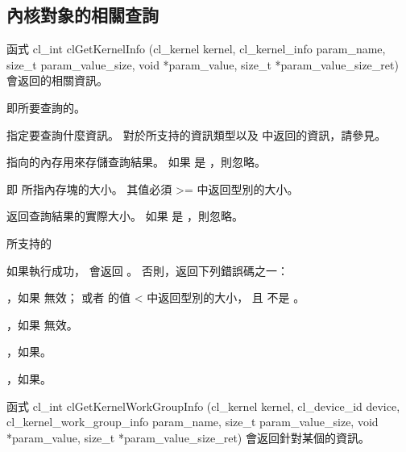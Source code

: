 \subsection{內核對象的相關查詢}

函式
\startCLFUNC
cl_int clGetKernelInfo (cl_kernel kernel,
			cl_kernel_info param_name,
			size_t param_value_size,
			void *param_value,
			size_t *param_value_size_ret)
\stopCLFUNC
會返回的相關資訊。

 即所要查詢的。

 指定要查詢什麼資訊。
對於所支持的資訊類型以及  中返回的資訊，請參見。

 指向的內存用來存儲查詢結果。
如果  是 ，則忽略。

 即  所指內存塊的大小。
其值必須 >= 中返回型別的大小。

 返回查詢結果的實際大小。
如果  是 ，則忽略。

\startbuffer[tblclGetKernelInfo]
 所支持的 
\stopbuffer
{}
{}

如果執行成功，  會返回 。
否則，返回下列錯誤碼之一：
\startigBase
\item {}，如果  無效；
或者  的值 < 中返回型別的大小，
且  不是 。

\item {}，如果  無效。

\item {}，如果\scdevfailres。

\item {}，如果\schostfailres。
\stopigBase

函式
\startCLFUNC
cl_int clGetKernelWorkGroupInfo (cl_kernel kernel,
			cl_device_id device,
			cl_kernel_work_group_info param_name,
			size_t param_value_size,
			void *param_value,
			size_t *param_value_size_ret)
\stopCLFUNC
會返回針對某個的資訊。

